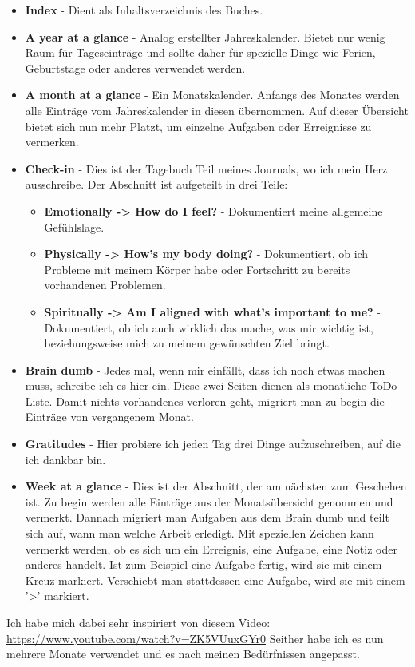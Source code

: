 \begin{itemize}
  \item \textbf{Index} - Dient als Inhaltsverzeichnis des Buches.
  \item \textbf{A year at a glance} - Analog erstellter Jahreskalender. Bietet nur wenig Raum für Tageseinträge und sollte daher für spezielle Dinge wie Ferien, Geburtstage oder anderes verwendet werden.
  \item \textbf{A month at a glance} - Ein Monatskalender. Anfangs des Monates werden alle Einträge vom Jahreskalender in diesen übernommen. Auf dieser Übersicht bietet sich nun mehr Platzt, um einzelne Aufgaben oder Erreignisse zu vermerken.
  \item \textbf{Check-in} - Dies ist der Tagebuch Teil meines Journals, wo ich mein Herz ausschreibe. Der Abschnitt ist aufgeteilt in drei Teile:
  \begin{itemize}
    \item \textbf{Emotionally -> How do I feel?} - Dokumentiert meine allgemeine Gefühlslage.
    \item \textbf{Physically -> How's my body doing?} - Dokumentiert, ob ich Probleme mit meinem Körper habe oder Fortschritt zu bereits vorhandenen Problemen.
    \item \textbf{Spiritually -> Am I aligned with what's important to me?} - Dokumentiert, ob ich auch wirklich das mache, was mir wichtig ist, beziehungsweise mich zu meinem gewünschten Ziel bringt.
  \end{itemize}
  \item \textbf{Brain dumb} - Jedes mal, wenn mir einfällt, dass ich noch etwas machen muss, schreibe ich es hier ein. Diese zwei Seiten dienen als monatliche ToDo-Liste. Damit nichts vorhandenes verloren geht, migriert man zu begin die Einträge von vergangenem Monat.
  \item \textbf{Gratitudes} - Hier probiere ich jeden Tag drei Dinge aufzuschreiben, auf die ich dankbar bin.
  \item \textbf{Week at a glance} - Dies ist der Abschnitt, der am nächsten zum Geschehen ist. Zu begin werden alle Einträge aus der Monatsübersicht genommen und vermerkt. Dannach migriert man Aufgaben aus dem Brain dumb und teilt sich auf, wann man welche Arbeit erledigt. Mit speziellen Zeichen kann vermerkt werden, ob es sich um ein Erreignis, eine Aufgabe, eine Notiz oder anderes handelt. Ist zum Beispiel eine Aufgabe fertig, wird sie mit einem Kreuz markiert. Verschiebt man stattdessen eine Aufgabe, wird sie mit einem '>' markiert.
\end{itemize}
Ich habe mich dabei sehr inspiriert von diesem Video:
\newline
\url{https://www.youtube.com/watch?v=ZK5VUuxGYr0}
\newline
Seither habe ich es nun mehrere Monate verwendet und es nach meinen Bedürfnissen angepasst.
